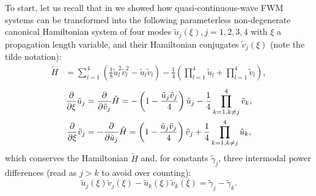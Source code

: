 \documentclass[11pt,a4paper]{article}
\numberwithin{equation}{section}
\begin{document}
To start, let us recall that in \cite{heskethCompleteWeierstrassElliptic2026} we showed how quasi-continuous-wave FWM systems can be transformed into the following parameterless non-degenerate canonical Hamiltonian system of four modes $\tilde{u}_j(\xi), j=1,2,3,4$ with $\xi$ a propagation length variable, and their Hamiltonian conjugates $\tilde{v}_j(\xi)$ (note the tilde notation):
\begin{align}
\tilde{H} &= \sum_{l=1}^{4} \left(\frac{1}{8} \tilde{u}^{2}_l \tilde{v}^{2}_l  - \tilde{u}_l \tilde{v}_l \right) - \frac{1}{4}\left(\prod_{l=1}^{4} \tilde{u}_l + \prod_{l=1}^{4} \tilde{v}_l\right), \label{eq:H-deg-tilde}
\end{align}
\begin{align}
\frac{\partial}{\partial \xi} \tilde{u}_j &= \frac{\partial}{\partial \tilde{v}_j} \tilde{H} = -\left(1 - \frac{\tilde{u}_j \tilde{v}_j}{4} \right) \tilde{u}_j - \frac{1}{4}\prod\limits_{k=1, k \ne j}^{4} \tilde{v}_k, \notag \\
\frac{\partial}{\partial \xi} \tilde{v}_j &= -\frac{\partial}{\partial \tilde{u}_j} \tilde{H} = \left( 1 - \frac{\tilde{u}_j \tilde{v}_j}{4}\right) \tilde{v}_j + \frac{1}{4}\prod\limits_{k=1, k \ne j}^{4} \tilde{u}_k, \label{eq:uv-tilde-deg-system}
\end{align}
which conserves the Hamiltonian $\tilde{H}$ and, for constants  $\tilde{\gamma}_j$, three intermodal power differences (read as $j > k$ to avoid over counting):
\begin{equation}
\label{eq:deg-fwm-power-conserved}
\tilde{u}_j(\xi) \tilde{v}_j(\xi) - \tilde{u}_k(\xi) \tilde{v}_k(\xi) = \tilde{\gamma}_j - \tilde{\gamma}_k.
\end{equation}
\end{document}
